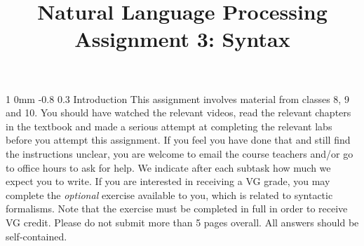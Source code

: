 \documentclass[11pt]{article}
\title{{\LARGE Natural Language Processing}\\[1.5mm]{\large Assignment 3: Syntax}}
\author{}
\date{} %
\makeatletter
\renewcommand{\section}{\@startsection
{section}%
{1}%
{0mm}%
{-0.8\baselineskip}%
{0.3\baselineskip}%
{\bfseries\large}}%
\makeatother
\begin{document}
 

\maketitle
\noindent
\section{Introduction}
\noindent This assignment involves material from classes 8, 9 and 10. You should
have watched the relevant videos, read the relevant chapters in the textbook and
made a serious attempt at completing the relevant labs before you attempt this
assignment. If you feel you have done that and still find the instructions
unclear, you are welcome to email the course teachers and/or go to office hours
to ask for help. We indicate after each subtask how much we expect you to write.
If you are interested in receiving a VG grade, you may complete the
\textit{optional} exercise available to you, which is related to syntactic
formalisms. Note that the exercise must be completed in full in order to receive
VG credit. Please do not submit more than 5 pages overall. All answers should be
self-contained.
\end{document}
